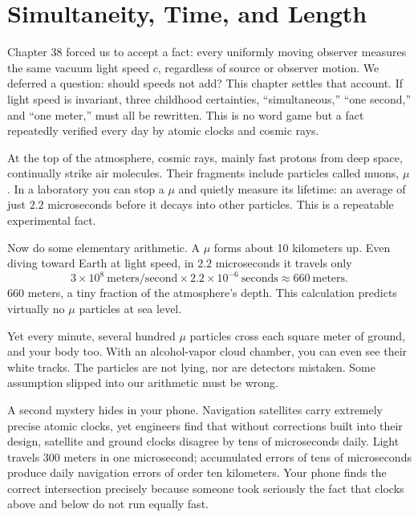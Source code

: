 \chapter{Simultaneity, Time, and Length}

Chapter 38 forced us to accept a fact: every uniformly moving observer measures the same vacuum light speed \(c\), regardless of source or observer motion. We deferred a question: should speeds not add? This chapter settles that account. If light speed is invariant, three childhood certainties, ``simultaneous,'' ``one second,'' and ``one meter,'' must all be rewritten. This is no word game but a fact repeatedly verified every day by atomic clocks and cosmic rays.


\begin{mainline}
At the top of the atmosphere, cosmic rays, mainly fast protons from deep space, continually strike air molecules. Their fragments include particles called muons, \(\mu\). In a laboratory you can stop a \(\mu\) and quietly measure its lifetime: an average of just \(2.2\) microseconds before it decays into other particles. This is a repeatable experimental fact.

Now do some elementary arithmetic. A \(\mu\) forms about 10 kilometers up. Even diving toward Earth at light speed, in \(2.2\) microseconds it travels only
\[
3\times10^{8}\ \text{meters/second}\times 2.2\times10^{-6}\ \text{seconds}\approx 660\ \text{meters}\text{.}
\]
660 meters, a tiny fraction of the atmosphere's depth. This calculation predicts virtually no \(\mu\) particles at sea level.

Yet every minute, several hundred \(\mu\) particles cross each square meter of ground, and your body too. With an alcohol-vapor cloud chamber, you can even see their white tracks. The particles are not lying, nor are detectors mistaken. Some assumption slipped into our arithmetic must be wrong.

A second mystery hides in your phone. Navigation satellites carry extremely precise atomic clocks, yet engineers find that without corrections built into their design, satellite and ground clocks disagree by tens of microseconds daily. Light travels 300 meters in one microsecond; accumulated errors of tens of microseconds produce daily navigation errors of order ten kilometers. Your phone finds the correct intersection precisely because someone took seriously the fact that clocks above and below do not run equally fast.
\end{mainline}

